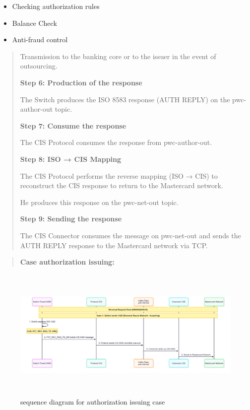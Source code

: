 \documentclass[12pt,a4paper]{report}
\begin{document}
\begin{itemize}
\item
  Checking authorization rules
\item
  Balance Check
\item
  Anti-fraud control
\end{itemize}

\begin{quote}
Transmission to the banking core or to the issuer in the event of
outsourcing.

\textbf{Step 6: Production of the response}

The Switch produces the ISO 8583 response (AUTH REPLY) on the
pwc-author-out topic.

\textbf{Step 7: Consume the response}

The CIS Protocol consumes the response from pwc-author-out.

\textbf{Step 8: ISO → CIS Mapping}

The CIS Protocol performs the reverse mapping (ISO → CIS) to reconstruct
the CIS response to return to the Mastercard network.

He produces this response on the pwc-net-out topic.

\textbf{Step 9: Sending the response}

The CIS Connector consumes the message on pwc-net-out and sends the AUTH
REPLY response to the Mastercard network via TCP.
\end{quote}

\begin{quote}
    \textbf{Case authorization issuing:}
\end{quote}

\begin{figure}[H]
\centering
\includegraphics[width=6.97452in,height=2.54278in]{media/image39.png}
\caption{sequence diagram for authorization issuing case}
\label{fig:SDAIC}
\end{figure}
\end{document}
